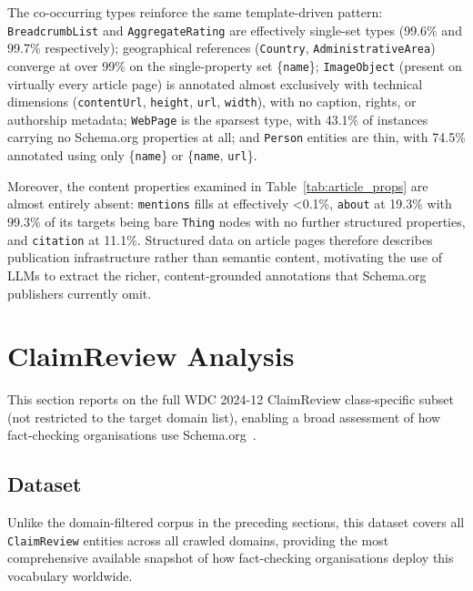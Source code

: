 \documentclass[11pt,a4paper]{article}
\begin{document}
The co-occurring types reinforce the same template-driven pattern:
\texttt{BreadcrumbList} and \texttt{AggregateRating} are effectively
single-set types (99.6\% and 99.7\% respectively); geographical references
(\texttt{Country}, \texttt{AdministrativeArea}) converge at over 99\% on
the single-property set \{\texttt{name}\}; \texttt{ImageObject} (present on
virtually every article page) is annotated almost exclusively with technical
dimensions (\texttt{contentUrl}, \texttt{height}, \texttt{url},
\texttt{width}), with no caption, rights, or authorship metadata;
\texttt{WebPage} is the sparsest type, with 43.1\% of instances carrying no
Schema.org properties at all; and \texttt{Person} entities are thin, with
74.5\% annotated using only \{\texttt{name}\} or \{\texttt{name},
\texttt{url}\}.

Moreover, the content properties examined in
Table~\ref{tab:article_props} are almost entirely absent: \texttt{mentions}
fills at effectively <0.1\%, \texttt{about} at 19.3\% with 99.3\% of its
targets being bare \texttt{Thing} nodes with no further structured
properties, and \texttt{citation} at 11.1\%.
Structured data on article pages therefore describes publication
infrastructure rather than semantic content, motivating the use of LLMs to
extract the richer, content-grounded annotations that Schema.org publishers
currently omit.

\section{ClaimReview Analysis}
\label{sec:claimreview}

This section reports on the full WDC 2024-12 ClaimReview class-specific
subset (not restricted to the target domain list), enabling a broad assessment
of how fact-checking organisations use Schema.org~\citep{schemaorg_claimreview}.

\subsection{Dataset}

Unlike the domain-filtered corpus in the preceding sections, this dataset
covers all \texttt{ClaimReview} entities across all crawled domains, providing
the most comprehensive available snapshot of how fact-checking organisations
deploy this vocabulary worldwide.
\end{document}
